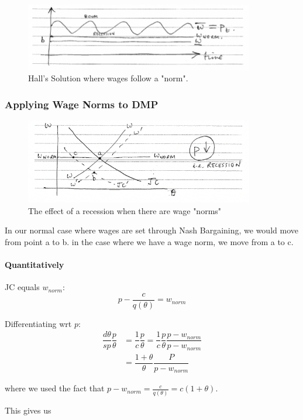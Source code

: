 \documentclass[11pt]{article}
\begin{document}
\begin{figure}[h]
\centering
\includegraphics[width=10cm]{photos/halls solution.png}
\caption{Hall's Solution where wages follow a "norm".}
\label{fig: Halls solution}
\end{figure}


\subsubsection{Applying Wage Norms to DMP}

\begin{figure}[h]
    \centering
    \includegraphics[width=10cm]{photos/applying rigid wage.png}
    \caption{The effect of a recession when there are wage "norms"}
    \label{fig: applied wage norms}
\end{figure}

In our normal case where wages are set through Nash Bargaining, we would move from point a to b. in the case where we have a wage norm, we move from a to c. 


\paragraph{Quantitatively} \mbox{}

\begin{deriv}
JC equals $w_{norm}$:
\[p - \dfrac{c}{q(\theta)} = w_{norm} \]

Differentiating wrt $p$:
\begin{equation}
\begin{aligned}
\dfrac{d\theta}{sp}\dfrac{p}{\theta}& = \dfrac{1}{c}\dfrac{p}{\theta} =  \dfrac{1}{c}\dfrac{p}{\theta}\dfrac{p-w_{norm}}{p-w_{norm}} \\
&= \dfrac{1+\theta}{\theta}\dfrac{P}{p-w_{norm}}
\end{aligned}
\end{equation}

where we used the fact that $p-w_{norm}=\frac{c}{q(\theta)}=c(1+\theta)$.

\end{deriv}
 This gives us
\end{document}
